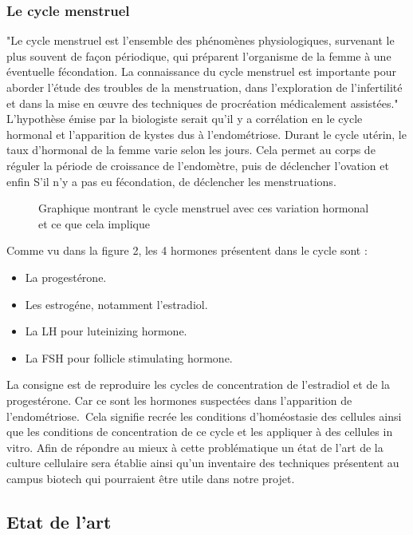 \documentclass[a4paper, 11pt]{article}
\begin{document}
\subsubsection{Le cycle menstruel}
"Le cycle menstruel est l'ensemble des phénomènes physiologiques,
survenant le plus souvent de façon périodique, qui préparent l'organisme de la femme à une éventuelle
fécondation.
La connaissance du cycle menstruel est importante pour aborder l'étude des troubles de la menstruation,
dans l'exploration de l'infertilité et dans la mise en œuvre des techniques de procréation médicalement
assistées."
\cite{Cycle_menstruel}\\
L'hypothèse émise par la biologiste serait qu'il y a corrélation en le cycle hormonal et l'apparition
de kystes dus à l'endométriose.
Durant le cycle utérin, le taux d'hormonal de la femme varie selon les jours. Cela permet
au corps de réguler la période de croissance de l'endomètre, puis de déclencher l'ovation et enfin
S'il n'y a pas eu fécondation, de déclencher les menstruations.
\begin{figure}[H]
    \centering
    \caption{Graphique montrant le cycle menstruel avec ces variation hormonal et ce que
        cela implique}
    \label{fig:Cycle menstruel}
\end{figure}
Comme vu dans la figure 2, les 4 hormones présentent dans le cycle sont :
\begin{itemize}
    \item La progestérone.
    \item Les estrogéne, notamment l'estradiol.
    \item La LH pour luteinizing hormone.
    \item La FSH pour follicle stimulating hormone.
\end{itemize}
La consigne est de reproduire les cycles de concentration de l'estradiol et de la progestérone.
Car ce sont les hormones suspectées dans l'apparition de l'endométriose. Cela signifie
recrée les conditions d'homéostasie des cellules ainsi que les conditions de
concentration de ce cycle et les appliquer à des cellules in vitro.
Afin de répondre au mieux à cette problématique un état de l'art de la culture
cellulaire sera établie ainsi qu'un inventaire des techniques présentent au campus biotech qui
pourraient être utile dans notre projet.
\newpage
\subsection{Etat de l'art}
\end{document}
